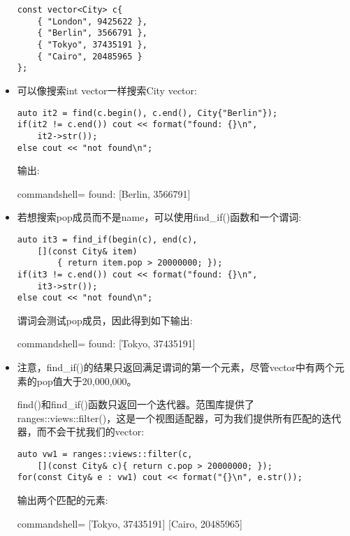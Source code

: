 \begin{itemize}
\begin{lstlisting}[style=styleCXX]
const vector<City> c{
	{ "London", 9425622 },
	{ "Berlin", 3566791 },
	{ "Tokyo", 37435191 },
	{ "Cairo", 20485965 }
};
\end{lstlisting}

\item 
可以像搜索int vector一样搜索City vector:

\begin{lstlisting}[style=styleCXX]
auto it2 = find(c.begin(), c.end(), City{"Berlin"});
if(it2 != c.end()) cout << format("found: {}\n",
	it2->str());
else cout << "not found\n";
\end{lstlisting}

输出:

\begin{tcblisting}{commandshell={}}
found: [Berlin, 3566791]
\end{tcblisting}

\item 
若想搜索pop成员而不是name，可以使用find\_if()函数和一个谓词:

\begin{lstlisting}[style=styleCXX]
auto it3 = find_if(begin(c), end(c),
	[](const City& item)
		{ return item.pop > 20000000; });
if(it3 != c.end()) cout << format("found: {}\n",
	it3->str());
else cout << "not found\n";
\end{lstlisting}

谓词会测试pop成员，因此得到如下输出:

\begin{tcblisting}{commandshell={}}
found: [Tokyo, 37435191]
\end{tcblisting}

\item 
注意，find\_if()的结果只返回满足谓词的第一个元素，尽管vector中有两个元素的pop值大于20,000,000。

find()和find\_if()函数只返回一个迭代器。范围库提供了ranges::views::filter()，这是一个视图适配器，可为我们提供所有匹配的迭代器，而不会干扰我们的vector:

\begin{lstlisting}[style=styleCXX]
auto vw1 = ranges::views::filter(c,
	[](const City& c){ return c.pop > 20000000; });
for(const City& e : vw1) cout << format("{}\n", e.str());
\end{lstlisting}

输出两个匹配的元素:

\begin{tcblisting}{commandshell={}}
[Tokyo, 37435191]
[Cairo, 20485965]
\end{tcblisting}
\end{itemize}

